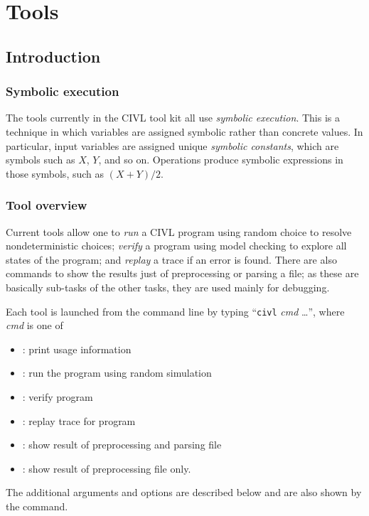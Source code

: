 \part{Tools}
\label{part:tools}

\chapter{Introduction}

\section{Symbolic execution}

The tools currently in the CIVL tool kit all use \emph{symbolic
  execution}.  This is a technique in which variables are assigned
symbolic rather than concrete values.  In particular, input variables
are assigned unique \emph{symbolic constants}, which are symbols such
as $X$, $Y$, and so on.  Operations produce symbolic expressions in
those symbols, such as $(X+Y)/2$.

\section{Tool overview}

Current tools allow one to \emph{run} a CIVL program using random
choice to resolve nondeterministic choices; \emph{verify} a program
using model checking to explore all states of the program; and
\emph{replay} a trace if an error is found.  There are also commands
to show the results just of preprocessing or parsing a file; as these
are basically sub-tasks of the other tasks, they are used mainly for
debugging.

Each tool is launched from the command line by typing ``\texttt{civl}
\textit{cmd} \ldots'', where \textit{cmd} is one of
\begin{itemize}
\item {} : print usage information
\item {}  : run the program using random simulation
\item {} : verify program
\item {} : replay trace for program
\item {} : show result of preprocessing and parsing file
\item {} : show result of preprocessing file only.
\end{itemize}
The additional arguments and options are described below and are also
shown by the  command.

